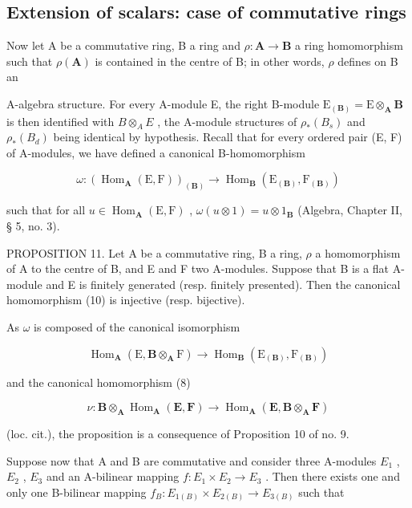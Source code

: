 \subsection{Extension of scalars: case of commutative rings}

Now let A be a commutative ring, B a ring and \(\rho: \mathbf{A} \to \mathbf{B}\) a ring homomorphism such that \(\rho(\mathbf{A})\) is contained in the centre of B; in other words, \(\rho\) defines on B an

A-algebra structure. For every A-module E, the right B-module \(\mathrm{E}_{(\mathbf{B})} = \mathrm{E} \otimes_{\mathbf{A}} \mathbf{B}\) is then identified with \(B \otimes_{A} E\) , the A-module structures of \(\rho_{*}(B_{s})\) and \(\rho_{*}(B_{d})\) being identical by hypothesis. Recall that for every ordered pair (E, F) of A-modules, we have defined a canonical B-homomorphism

\[
\omega : \left(\operatorname{Hom} _ {\mathbf {A}} (\mathrm{E}, \mathrm{F})\right) _ {(\mathbf {B})} \rightarrow \operatorname{Hom} _ {\mathbf {B}} \left(\mathrm{E} _ {(\mathbf {B})}, \mathrm{F} _ {(\mathbf {B})}\right)\tag{10}
\]

such that for all \(u \in \operatorname{Hom}_{\mathbf{A}}(\mathrm{E}, \mathrm{F})\) , \(\omega(u \otimes 1) = u \otimes 1_{\mathbf{B}}\) (Algebra, Chapter II, § 5, no. 3).

PROPOSITION 11. Let A be a commutative ring, B a ring, \(\rho\) a homomorphism of A to the centre of B, and E and F two A-modules. Suppose that B is a flat A-module and E is finitely generated (resp. finitely presented). Then the canonical homomorphism (10) is injective (resp. bijective).

As \(\omega\) is composed of the canonical isomorphism

\[
\operatorname{Hom} _ {\mathbf {A}} (\mathrm{E}, \mathbf {B} \otimes_ {\mathbf {A}} \mathrm{F}) \rightarrow \operatorname{Hom} _ {\mathbf {B}} (\mathrm{E} _ {(\mathbf {B})}, \mathrm{F} _ {(\mathbf {B})})
\]

and the canonical homomorphism (8)

\[
\nu \colon \mathbf {B} \otimes_ {\mathbf {A}} \operatorname{Hom} _ {\mathbf {A}} (\mathbf {E}, \mathbf {F}) \rightarrow \operatorname{Hom} _ {\mathbf {A}} (\mathbf {E}, \mathbf {B} \otimes_ {\mathbf {A}} \mathbf {F})
\]

(loc. cit.), the proposition is a consequence of Proposition 10 of no. 9.

Suppose now that A and B are commutative and consider three A-modules \(E_{1}\) , \(E_{2}\) , \(E_{3}\) and an A-bilinear mapping \(f: E_{1} \times E_{2} \to E_{3}\) . Then there exists one and only one B-bilinear mapping \(f_{B}: E_{1(B)} \times E_{2(B)} \to E_{3(B)}\) such that

